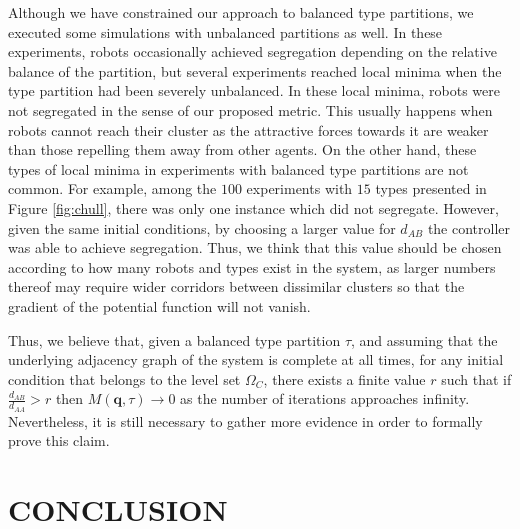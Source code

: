 \documentclass[letterpaper, 10 pt, conference]{ieeeconf}  %
\begin{document}
Although we have constrained our approach to balanced type partitions,
we executed some simulations with unbalanced partitions as well. In
these experiments, robots occasionally achieved segregation depending
on the relative balance of the partition, but several experiments
reached local minima when the type partition had been severely
unbalanced. In these local minima, robots were not segregated in the
sense of our proposed metric. This usually happens when robots cannot
reach their cluster as the attractive forces towards it are weaker
than those repelling them away from other agents. On the other hand,
these types of local minima in experiments with balanced type
partitions are not common. For example, among the $100$ experiments
with $15$ types presented in Figure \ref{fig:chull}, there was only
one instance which did not segregate. However, given the same initial
conditions, by choosing a larger value for $d_{AB}$ the controller was
able to achieve segregation. Thus, we think that this value should be
chosen according to how many robots and types exist in the system, as
larger numbers thereof may require wider corridors between dissimilar
clusters so that the gradient of the potential function will not
vanish.

Thus, we believe that, given a balanced type partition $\tau$, and
assuming that the underlying adjacency graph of the system is complete
at all times, for any initial condition that belongs to the level set
$\Omega_C$, there exists a finite value $r$ such that if
$\frac{d_{AB}}{d_{AA}} > r$ then $M(\mathbf{q}, \tau) \to 0$ as the
number of iterations approaches infinity. Nevertheless, it is still
necessary to gather more evidence in order to formally prove this
claim.

\section{CONCLUSION}
\label{sec:conclusion}
\end{document}
